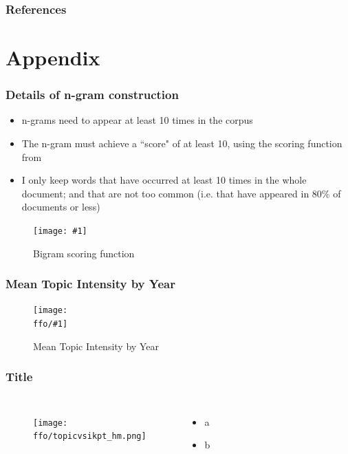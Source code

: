 \documentclass{beamer}
\newcommand{\ffo}{dicfullmc10thr10defnob5noa0_8_4t}
\newcommand{\insertfigurenoffo}[3]{
\begin{figure}[h!]
  \centering
  \texttt{[image: \#1]}
  \caption{#2}
  \label{fig:#1}
\end{figure}
}
\newcommand{\insertfigure}[2]{
\begin{figure}[h!]
  \centering
  \texttt{[image: \\ffo/\#1]}
  \centering
  \captionsetup{font=scriptsize}
  \caption{#2}
  \label{fig:#1}
\end{figure}
}
\begin{document}

\begin{frame}[allowframebreaks]
\frametitle{References}

\end{frame}

\section{Appendix}

\begin{frame}
\frametitle{Details of n-gram construction}
\label{ngram_details}
\begin{itemize}
\item n-grams need to appear at least 10 times in the corpus
\item The n-gram must achieve a ``score" of at least 10, using the scoring function from \cite{Mikolov2013-be} \hyperlink{ngram_main}{}
\item I only keep words that have occurred at least 10 times in the whole document; and that are not too common (i.e. that have appeared in 80\% of documents or less)
\end{itemize}
\insertfigurenoffo{mikolov_formula}{Bigram scoring function}{0.3}
\end{frame}

\begin{frame}
\frametitle{Mean Topic Intensity by Year}
\label{meantiy_details}
\hyperlink{results}{}
\insertfigure{mean_tiy}{Mean Topic Intensity by Year}
\end{frame}


\begin{frame}
\frametitle{Title}
       \begin{columns}
             \begin{figure}[h!]
		  \centering
		  \texttt{[image: \\ffo/topicvsikpt\_hm.png]}
		  \centering
		  \captionsetup{font=scriptsize}
		  \label{fig:topicvsikpt_hm}
			\end{figure}
          \scriptsize
              \begin{itemize}
			  \item a
			  \item b
			\end{itemize}
	  \end{columns} 
\end{frame}
\end{document}
